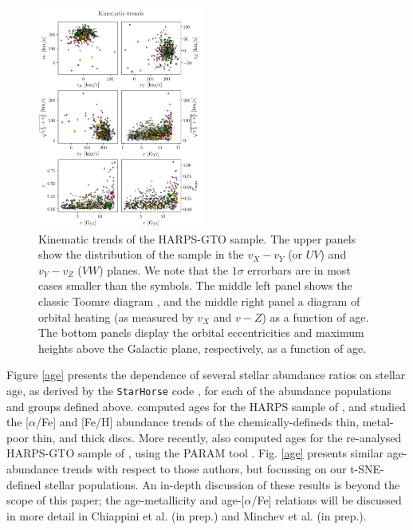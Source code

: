 \documentclass{aa}  %
\begin{document}
\begin{figure}\centering
 \includegraphics[width=0.49\textwidth]{im/harps_tsne-kin-abundsplot_teffcut.png}
\caption{Kinematic trends of the HARPS-GTO sample. The upper panels show the distribution of the sample in the $v_X-v_Y$ (or $UV$) and $v_Y-v_Z$ ($VW$) planes. We note that the $1\sigma$ errorbars are in most cases smaller than the symbols. The middle left panel shows the classic Toomre diagram \citep[e.g.][]{Feltzing2003}, and the middle right panel a diagram of orbital heating (as measured by $v_X$ and $v-Z$) as a function of age. The bottom panels display the orbital eccentricities and maximum heights above the Galactic plane, respectively, as a function of age.}
\label{kin}
\end{figure}

Figure \ref{age} presents the dependence of several stellar abundance ratios on stellar age, as derived by the {\tt StarHorse} code \citep{Queiroz2018}, for each of the abundance populations and groups defined above. \citet{Haywood2013} computed ages for the HARPS sample of \citet{Adibekyan2012}, and studied the [$\alpha$/Fe] and [Fe/H] abundance trends of the chemically-defineds thin, metal-poor thin, and thick discs. More recently, \citet{DelgadoMena2018} also computed ages for the re-analysed HARPS-GTO sample of \citet{DelgadoMena2017}, using the PARAM tool \citep{daSilva2006}. Fig. \ref{age} presents similar age-abundance trends with respect to those authors, but focussing on our t-SNE-defined stellar populations. An in-depth discussion of these results is beyond the scope of this paper; the age-metallicity and age-[$\alpha$/Fe] relations will be discussed in more detail in Chiappini et al. (in prep.) and Minchev et al. (in prep.).
\end{document}
